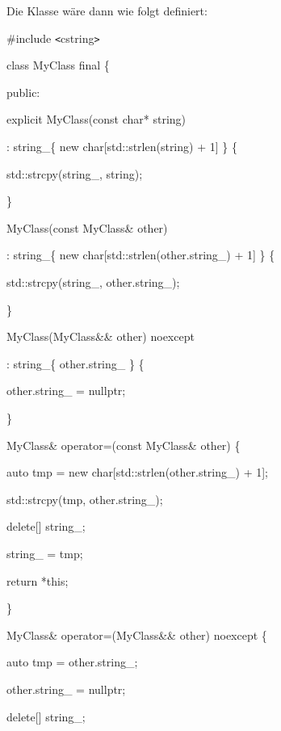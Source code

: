 \documentclass{article}
\begin{document}
Die Klasse wäre dann wie folgt definiert:

\vspace{12pt}
\#include \texttt{<}cstring\texttt{>}

\vspace{12pt}
class MyClass final \{

public:    

\parindent=14pt
explicit MyClass(const char* string)        

\parindent=28pt
: string\_\{ new char[std::strlen(string) + 1] \} \{        

std::strcpy(string\_, string);    

\parindent=43pt
\}    

\vspace{12pt}
\parindent=14pt
MyClass(const MyClass\& other)        

\parindent=28pt
: string\_\{ new char[std::strlen(other.string\_) + 1] \} \{        

std::strcpy(string\_, other.string\_);    

\parindent=43pt
\}    

\vspace{12pt}
\parindent=14pt
MyClass(MyClass\&\& other) noexcept        

\parindent=28pt
: string\_\{ other.string\_ \} \{        

other.string\_ = nullptr;    

\parindent=43pt
\}    

\vspace{12pt}
\parindent=14pt
MyClass\& operator=(const MyClass\& other) \{        

\parindent=28pt
auto tmp = new char[std::strlen(other.string\_) + 1];        

std::strcpy(tmp, other.string\_);        

\parindent=57pt
delete[] string\_;        

\parindent=28pt
string\_ = tmp;        

return *this;    

\parindent=43pt
\}    

\vspace{12pt}
\parindent=14pt
MyClass\& operator=(MyClass\&\& other) noexcept \{        

\parindent=28pt
auto tmp = other.string\_;        

other.string\_ = nullptr;        

\parindent=57pt
delete[] string\_;        
\end{document}
